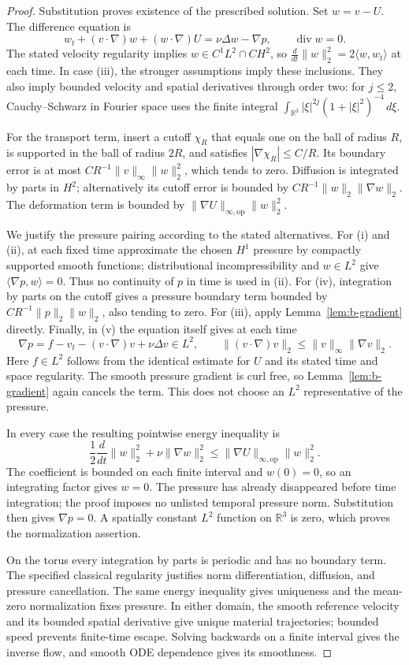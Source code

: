 \begin{proof}
Substitution proves existence of the prescribed solution. Set $w=v-U$.
The difference equation is
\[
 w_t+(v\cdot\nabla)w+(w\cdot\nabla)U
    =\nu\Delta w-\nabla p,\qquad \operatorname{div}w=0.
\]
The stated velocity regularity implies $w\in C^1L^2\cap CH^2$, so
$\frac d{dt}\|w\|_2^2=2\langle w,w_t\rangle$ at each time. In case
(iii), the stronger assumptions imply these inclusions. They also imply
bounded velocity and spatial derivatives through order two: for $j\le2$,
Cauchy--Schwarz in Fourier space uses the finite integral
$\int_{\mathbb R^3}|\xi|^{2j}(1+|\xi|^2)^{-4}\,d\xi$.

For the transport term, insert a cutoff $\chi_R$ that equals one on the
ball of radius $R$, is supported in the ball of radius $2R$, and satisfies
$|\nabla\chi_R|\le C/R$. Its boundary error is at most
$CR^{-1}\|v\|_\infty\|w\|_2^2$, which tends to zero. Diffusion is
integrated by parts in $H^2$; alternatively its cutoff error is bounded by
$CR^{-1}\|w\|_2\|\nabla w\|_2$. The deformation term is bounded by
$\|\nabla U\|_{\infty,\mathrm{op}}\|w\|_2^2$.

We justify the pressure pairing according to the stated alternatives.
For (i) and (ii), at each fixed time approximate the chosen $H^1$ pressure
by compactly supported smooth functions; distributional incompressibility
and $w\in L^2$ give $\langle\nabla p,w\rangle=0$. Thus no continuity
of $p$ in time is used in (ii). For (iv), integration by parts on the
cutoff gives a pressure boundary term bounded by
$CR^{-1}\|p\|_2\|w\|_2$, also tending to zero. For (iii), apply
Lemma~\ref{lem:b-gradient} directly. Finally, in (v) the equation itself
gives at each time
\[
 \nabla p=f-v_t-(v\cdot\nabla)v+\nu\Delta v\in L^2,
 \qquad \|(v\cdot\nabla)v\|_2\le\|v\|_\infty\|\nabla v\|_2.
\]
Here $f\in L^2$ follows from the identical estimate for $U$ and its stated
time and space regularity. The smooth pressure gradient is curl free, so
Lemma~\ref{lem:b-gradient} again cancels the term. This does not choose an
$L^2$ representative of the pressure.

In every case the resulting pointwise energy inequality is
\[
 \frac12\frac d{dt}\|w\|_2^2+\nu\|\nabla w\|_2^2
 \le \|\nabla U\|_{\infty,\mathrm{op}}\|w\|_2^2.
\]
The coefficient is bounded on each finite interval and $w(0)=0$, so an
integrating factor gives $w=0$. The pressure has already disappeared before
time integration; the proof imposes no unlisted temporal pressure norm.
Substitution then gives $\nabla p=0$. A spatially constant $L^2$ function
on $\mathbb R^3$ is zero, which proves the normalization assertion.

On the torus every integration by parts is periodic and has no boundary
term. The specified classical regularity justifies norm differentiation,
diffusion, and pressure cancellation. The same energy inequality gives
uniqueness and the mean-zero normalization fixes pressure. In either domain,
the smooth reference velocity and its bounded spatial derivative give
unique material trajectories; bounded speed prevents finite-time escape.
Solving backwards on a finite interval gives the inverse flow, and smooth
ODE dependence gives its smoothness.
\end{proof}

